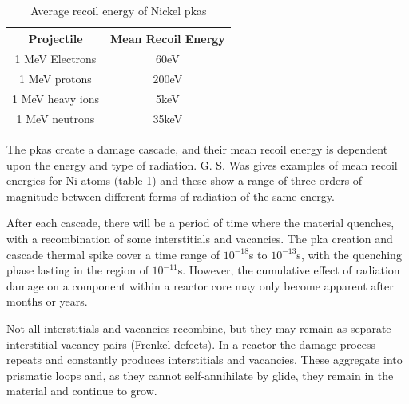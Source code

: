 \begin{table}[h]
\begin{center}
\renewcommand{\arraystretch}{1.2}
\begin{tabular}{c c}
\hline\hline
Projectile & Mean Recoil Energy \\
\hline\hline
1 MeV Electrons & 60eV \\
1 MeV protons & 200eV \\
1 MeV heavy ions & 5keV \\
1 MeV neutrons & 35keV \\
\hline\hline
\end{tabular}
\end{center}
\caption{Average recoil energy of Nickel \acrshort{pka}s\cite{gswas}}
\label{table:nirecoilenergy}
\end{table}

The \acrshort{pka}s create a damage cascade, and their mean recoil energy is dependent upon the energy and type of radiation.  G. S. Was\cite{gswas} gives examples of mean recoil energies for \gls{Ni} atoms (table \ref{table:nirecoilenergy}) and these show a range of three orders of magnitude between different forms of radiation of the same energy.  

After each cascade, there will be a period of time where the material quenches, with a recombination of some interstitials and vacancies.  The \acrshort{pka} creation and cascade thermal spike cover a time range of $10^{-18}$s to $10^{-13}$s, with the quenching phase lasting in the region of $10^{-11}$s.  However, the cumulative effect of radiation damage on a component within a reactor core may only become apparent after months or years.

Not all interstitials and vacancies recombine, but they may remain as separate interstitial vacancy pairs (Frenkel defects\cite{frenkel1}).  In a reactor the damage process repeats and constantly produces interstitials and vacancies.  These aggregate into prismatic loops\cite{prisloops2} and, as they cannot self-annihilate by glide\cite{prisloop3}, they remain in the material and continue to grow.

